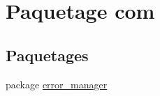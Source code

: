\hypertarget{namespacecom}{\section{Paquetage com}
\label{namespacecom}
}
\subsection*{Paquetages}
\begin{DoxyCompactItemize}
\item 
package \hyperlink{namespacecom_1_1error__manager}{error\-\_\-manager}
\end{DoxyCompactItemize}
